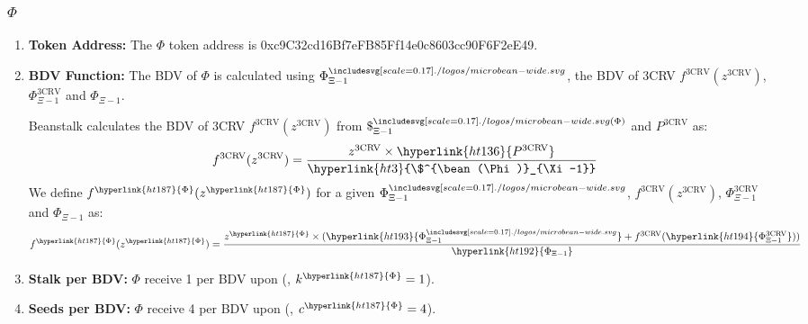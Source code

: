 \documentclass[class=article, crop=false]{standalone}
\begin{document}
\subsubsection{$\Phi$}
    \begin{enumerate}
        \item \textbf{Token Address:} The \hyperlink{ht187}{$\Phi$} token address is 0xc9C32cd16Bf7eFB85Ff14e0c8603cc90F6F2eE49.
        \item \textbf{BDV Function:} The BDV of \hyperlink{ht187}{$\Phi$} is calculated using \hyperlink{ht193}{$\Phi_{\Xi-1}^{\bean}$}, the BDV of 3CRV $f^{\text{3CRV}}(z^{\text{3CRV}})$, \hyperlink{ht194}{$\Phi_{\Xi-1}^{\text{3CRV}}$} and \hyperlink{ht192}{$\Phi_{\Xi-1}$}.

Beanstalk calculates the BDV of 3CRV $f^{\text{3CRV}}(z^{\text{3CRV}})$ from \hyperlink{ht3}{$\$^{\bean(\Phi)}_{\Xi-1}$} and \hyperlink{ht136}{$P^{\text{3CRV}}$} as:
$$f^{\text{3CRV}}(z^{\text{3CRV}}) = \frac{z^{\text{3CRV}} \times \hyperlink{ht136}{P^{\text{3CRV}}}}{\hyperlink{ht3}{\$^{\bean(\Phi)}_{\Xi-1}}}$$
We define $f^{\hyperlink{ht187}{\Phi}}(z^{\hyperlink{ht187}{\Phi}})$ for a given \hyperlink{ht193}{$\Phi_{\Xi-1}^{\bean}$}, $f^{\text{3CRV}}(z^{\text{3CRV}})$, \hyperlink{ht194}{$\Phi_{\Xi-1}^{\text{3CRV}}$} and \hyperlink{ht192}{$\Phi_{\Xi-1}$} as:
$$f^{\hyperlink{ht187}{\Phi}}(z^{\hyperlink{ht187}{\Phi}}) = \frac{z^{\hyperlink{ht187}{\Phi}} \times ( \hyperlink{ht193}{\Phi_{\Xi-1}^{\bean}} + f^{\text{3CRV}}(\hyperlink{ht194}{\Phi_{\Xi-1}^{\text{3CRV}}}))}{\hyperlink{ht192}{\Phi_{\Xi-1}}}$$
        \item \textbf{Stalk per BDV:} \hyperlink{ht187}{$\Phi$}  receive 1  per BDV upon  (, $k^{\hyperlink{ht187}{\Phi}} = 1$).
        \item \textbf{Seeds per BDV:} \hyperlink{ht187}{$\Phi$}  receive 4  per BDV upon  (, $c^{\hyperlink{ht187}{\Phi}} = 4$).
    \end{enumerate}
\end{document}
